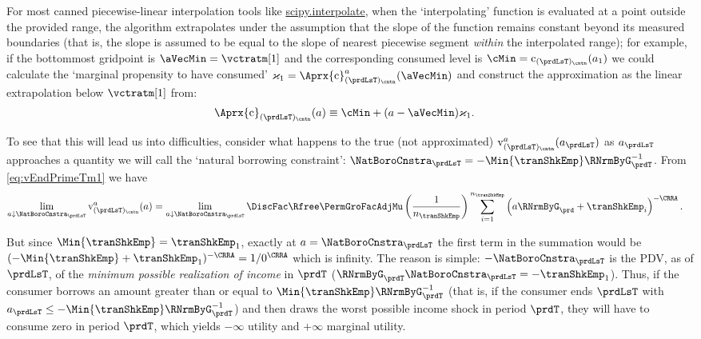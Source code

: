 \documentclass[titlepage, headings=optiontotocandhead]{econtex}
\begin{document}
For most canned piecewise-linear interpolation tools like \href{https://docs.scipy.org/doc/scipy/tutorial/interpolate.html}{scipy.interpolate}, when the `interpolating' function is evaluated at a point outside the provided range, the algorithm extrapolates under the assumption that the slope of the function remains constant beyond its measured boundaries (that is, the slope is assumed to be equal to the slope of nearest piecewise segment \emph{within} the interpolated range); for example, if the bottommost gridpoint is $\aVecMin = \vctratm[1]$ and the corresponding consumed level is $\cMin = \mathrm{c}_{(\prdLsT)_\cntn}(a_1)$ we could calculate the `marginal propensity to have consumed' $\varkappa_{1}=
\Aprx{\mathrm{c}}_{(\prdLsT)_\cntn}^{a}(\aVecMin)$ and construct the approximation as the linear extrapolation below $\vctratm[1]$ from:
\begin{equation}\begin{gathered}\begin{aligned}
      \Aprx{\mathrm{c}}_{(\prdLsT)_\cntn}(a)  &  \equiv \cMin + (a-\aVecMin)\varkappa_{1}  \label{eq:ExtrapLin}.
    \end{aligned}\end{gathered}\end{equation}

To see that this will lead us into difficulties, consider what happens to the true (not approximated) $\mathrm{v}^{a}_{(\prdLsT)_\cntn}(a_{\prdLsT})$ as $a_{\prdLsT}$ approaches a quantity we will call the `natural borrowing constraint': $\NatBoroCnstra_{\prdLsT}=-\Min{\tranShkEmp}\RNrmByG_{\prdT}^{-1}$.  From
\eqref{eq:vEndPrimeTm1} we have
\begin{equation}\begin{gathered}\begin{aligned}
      \lim_{a \downarrow \NatBoroCnstra_{\prdLsT}} \mathrm{v}^{a}_{(\prdLsT)_\cntn}(a)
      & =                                                                                         \lim_{a \downarrow \NatBoroCnstra_{\prdLsT}} \DiscFac \Rfree \PermGroFacAdjMu \left(\frac{1}{n_{\tranShkEmp}}\right) \sum_{i=1}^{n_{\tranShkEmp}} \left( a \RNrmByG_{\prd}+ \tranShkEmp_{i}\right)^{-\CRRA}.
    \end{aligned}\end{gathered}\end{equation}

But since $\Min{\tranShkEmp}=\tranShkEmp_{1}$, exactly at $a=\NatBoroCnstra_{\prdLsT}$ the first term in the summation would be $(-\Min{\tranShkEmp}+\tranShkEmp_{1})^{-\CRRA}=1/0^{\CRRA}$ which is infinity.  The reason is simple: $-\NatBoroCnstra_{\prdLsT}$ is the PDV, as of $\prdLsT$, of the \emph{minimum possible realization of income} in $\prdT$ ($\RNrmByG_{\prdT}\NatBoroCnstra_{\prdLsT} = -\tranShkEmp_{1}$).  Thus, if the consumer borrows an amount greater than or equal to $\Min{\tranShkEmp}\RNrmByG_{\prdT}^{-1}$ (that is, if the consumer ends $\prdLsT$ with $a_{\prdLsT} \leq -\Min{\tranShkEmp}\RNrmByG_{\prdT}^{-1}$) and then draws the worst possible income shock in period $\prdT$, they will have to consume zero in period $\prdT$, which yields $-\infty$ utility and $+\infty$ marginal utility.
\end{document}

